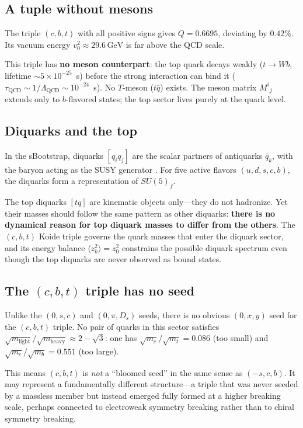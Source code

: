 \documentclass[12pt,a4paper]{article}
\newcommand{\GeV}{\,\text{GeV}}
\begin{document}
\subsection{A tuple without mesons}

The triple $(c, b, t)$ with all positive signs gives $Q = 0.6695$, 
deviating by $0.42\%$. Its vacuum energy $v_0^2 \approx 29.6\GeV$ 
is far above the QCD scale.

This triple has \textbf{no meson counterpart}: the top quark decays 
weakly ($t \to Wb$, lifetime $\sim 5 \times 10^{-25}$~s) before the 
strong interaction can bind it ($\tau_{\text{QCD}} \sim 1/\Lambda_{\text{QCD}} 
\sim 10^{-24}$~s). No $T$-meson ($t\bar{q}$) exists. The meson matrix 
$M^i{}_j$ extends only to $b$-flavored states; the top sector lives 
purely at the quark level.

\subsection{Diquarks and the top}

In the sBootstrap, diquarks $[q_i q_j]$ are the scalar partners of 
antiquarks $\bar{q}_k$, with the baryon acting as the SUSY generator 
\cite{CattoGursey, Miyazawa}. For five active flavors 
$(u, d, s, c, b)$, the diquarks form a representation of $SU(5)_f$.

The top diquarks $[tq]$ are kinematic objects only---they do not 
hadronize. Yet their masses should follow the same pattern as other 
diquarks: \textbf{there is no dynamical reason for top diquark masses 
to differ from the others}. The $(c,b,t)$ Koide triple governs the 
quark masses that enter the diquark sector, and its energy balance 
$\langle z_k^2\rangle = z_0^2$ constrains the possible diquark 
spectrum even though the top diquarks are never observed as bound 
states.

\subsection{The $(c,b,t)$ triple has no seed}

Unlike the $(0,s,c)$ and $(0,\pi,D_s)$ seeds, there is no obvious 
$(0, x, y)$ seed for the $(c,b,t)$ triple. No pair of quarks in this 
sector satisfies $\sqrt{m_{\text{light}}}/\sqrt{m_{\text{heavy}}} 
\approx 2 - \sqrt{3}$: one has $\sqrt{m_c}/\sqrt{m_t} = 0.086$ 
(too small) and $\sqrt{m_c}/\sqrt{m_b} = 0.551$ (too large).

This means $(c,b,t)$ is \emph{not} a ``bloomed seed'' in the same 
sense as $(-s,c,b)$. It may represent a fundamentally different 
structure---a triple that was never seeded by a massless member but 
instead emerged fully formed at a higher breaking scale, perhaps 
connected to electroweak symmetry breaking rather than to chiral 
symmetry breaking.
\end{document}
